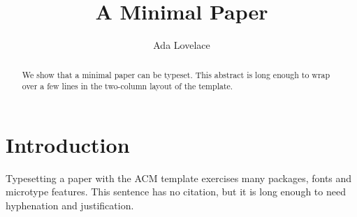 \documentclass[sigconf]{acmart}
\begin{document}
\title{A Minimal Paper}
\author{Ada Lovelace}
\begin{abstract}
We show that a minimal paper can be typeset. This abstract is long enough to wrap over a few lines in the two-column layout of the template.
\end{abstract}
\maketitle
\section{Introduction}
Typesetting a paper with the ACM template exercises many packages, fonts and microtype features. This sentence has no citation, but it is long enough to need hyphenation and justification.
\end{document}
